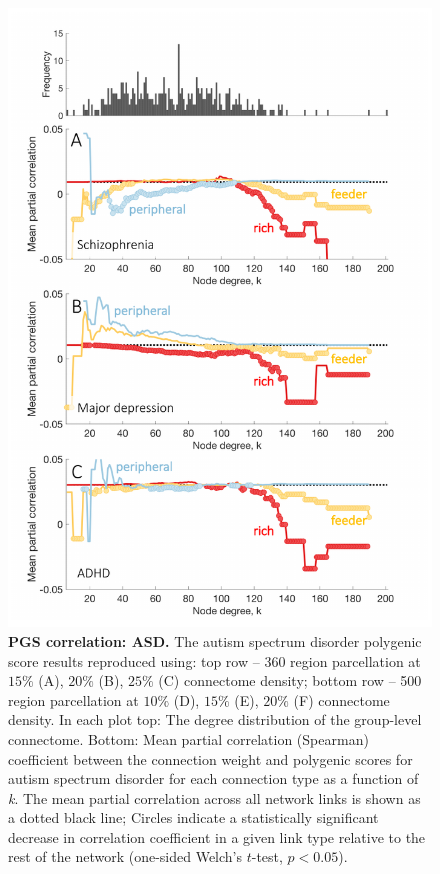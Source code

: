\begin{figure}[h!]
\begin{center}
\includegraphics[width=1\textwidth]{Chapter5/SFigure6.pdf}%
\end{center}
\caption{\textbf{PGS correlation: ASD.}
The autism spectrum disorder polygenic score results reproduced using: top row -- 360 region parcellation at $15\%$ (A), $20\%$ (B), $25\%$ (C) connectome density; bottom row -- 500 region parcellation at $10\%$ (D), $15\%$ (E), $20\%$ (F) connectome density. In each plot top: The degree distribution of the group-level connectome. Bottom: Mean partial correlation (Spearman) coefficient between the connection weight and polygenic scores for autism spectrum disorder for each connection type as a function of \textit{k}. The mean partial correlation across all network links is shown as a dotted black line; Circles indicate a statistically significant decrease in correlation coefficient in a given link type relative to the rest of the network (one-sided Welch's $t$-test, $p < 0.05$).}
\label{fig:Ch5SFig6}
\end{figure}

